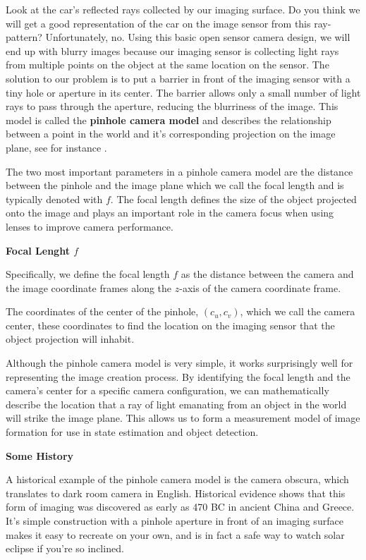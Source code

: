 Look at the car's reflected rays collected by our imaging surface. Do you think we will get
a good representation of the car on the image sensor
from this ray-pattern? Unfortunately, no. Using this basic open
sensor camera design, we will end up with blurry images because our imaging
sensor is collecting light rays from multiple points on the object at the same
location on the sensor. The solution to our problem is to put a barrier in front of the imaging sensor
with a tiny hole or aperture in its center. The barrier allows only a small number of light rays to pass
through the aperture, reducing the blurriness of the image. This model is called the \textbf{pinhole camera model} and describes the relationship between a point in
the world and it's corresponding projection on the image plane, see for instance \cite{PinholeCameraWiki}. 

The two most important parameters in a pinhole camera model are the distance between
the pinhole and the image plane which we call the focal length and is typically denoted with $f$. 
The focal length defines the size of the object projected
onto the image and plays an important role
in the camera focus when using lenses to improve camera performance. 

\begin{framed}
\begin{remark}{\textbf{Focal Lenght $f$}}

Specifically, we define the focal length $f$
as the distance between the camera and the
image coordinate frames along the $z$-axis of
the camera coordinate frame.
\end{remark}
\end{framed}


The coordinates of
the center of the pinhole, $(c_u, c_v)$, which we call the camera center, these coordinates to
find the location on the imaging sensor that the object projection will inhabit. 

Although the pinhole camera model is very simple, it works surprisingly well for representing the image
creation process. By identifying
the focal length and the camera's center for
a specific camera configuration, we can mathematically describe
the location that a ray of light emanating from an object in the world will strike
the image plane. This allows us to form a measurement model of image formation for use in state estimation
and object detection. 


\begin{framed}
\begin{remark}{\textbf{Some History}}

A historical example of the pinhole camera model
is the camera obscura, which translates to
dark room camera in English. Historical evidence shows that this form of imaging
was discovered as early as 470 BC in ancient
China and Greece. It's simple construction with a pinhole aperture in front of an imaging surface makes it
easy to recreate on your own, and is in fact a safe way to watch solar eclipse if
you're so inclined.
\end{remark}
\end{framed}


